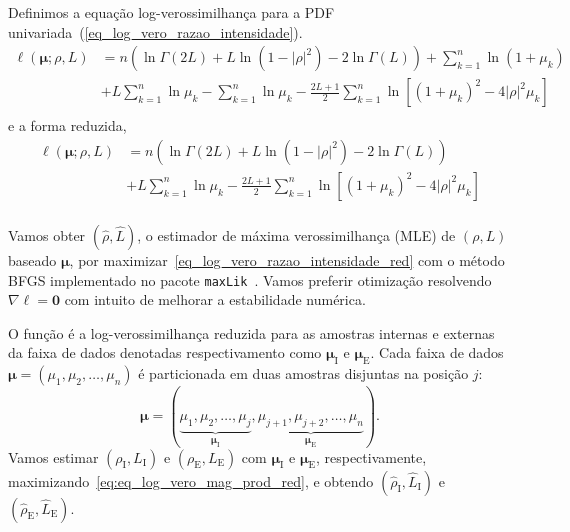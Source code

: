Definimos a equação log-verossimilhança para a PDF univariada~(\ref{eq_log_vero_razao_intensidade}).
\begin{equation}\nonumber
\begin{split}
    \ell(\bm \mu;\rho, L)&=n\left(\ln\Gamma(2L)+L\ln(1-|\rho|^2)-2\ln\Gamma(L)\right)+\sum_{k=1}^{n}\ln(1+\mu_k)\\
                         &+L\sum_{k=1}^{n}\ln\mu_k-\sum_{k=1}^{n}\ln\mu_k-\frac{2L+1}{2}\sum_{k=1}^{n} \ln\left[(1+\mu_k)^2-4|\rho|^2\mu_k\right]\\
\end{split}
 \end{equation}
e a forma reduzida,
\begin{equation}\label{eq_log_vero_razao_intensidade_red}
\begin{split}
    \ell(\bm \mu;\rho, L)&=n\left(\ln\Gamma(2L)+L\ln(1-|\rho|^2)-2\ln\Gamma(L)\right)\\
                         &+L\sum_{k=1}^{n}\ln\mu_k-\frac{2L+1}{2}\sum_{k=1}^{n} \ln\left[(1+\mu_k)^2-4|\rho|^2\mu_k\right]\\
\end{split}
 \end{equation} 

Vamos obter $(\widehat \rho, \widehat L)$, o estimador de máxima verossimilhança (MLE) de $(\rho, L)$ baseado $\bm \mu$, por maximizar~\eqref{eq_log_vero_razao_intensidade_red} com o método BFGS implementado no pacote \texttt{maxLik}~\citep{ht}. Vamos preferir otimização resolvendo $\nabla\ell=\bm 0$ com intuito de melhorar a estabilidade numérica.

O função é a log-verossimilhança reduzida para as amostras internas e externas da faixa de dados denotadas respectivamento como $\bm \mu_\text{I}$ e $\bm \mu_\text{E}$. Cada faixa de dados $\bm \mu = (\mu_1,\mu_2,\dots,\mu_n)$ é particionada em duas amostras disjuntas na posição $j$:  
$$
\bm \mu = (\underbrace{\mu_1,\mu_2,\dots,\mu_j}_{\bm \mu_\text{I}}, 
\underbrace{\mu_{j+1}, \mu_{j+2},\dots,\mu_n}_{\bm \mu_\text{E}}).
$$
Vamos estimar $(\rho_\text{I},L_\text{I})$ e $(\rho_\text{E},L_\text{E})$ com $\bm \mu_\text{I}$ e $\bm \mu_\text{E}$, respectivamente, maximizando~\eqref{eq:eq_log_vero_mag_prod_red}, e obtendo $(\widehat{\rho}_\text{I}, \widehat{L}_\text{I})$ e $(\widehat{\rho}_\text{E}, \widehat{L}_\text{E})$.

